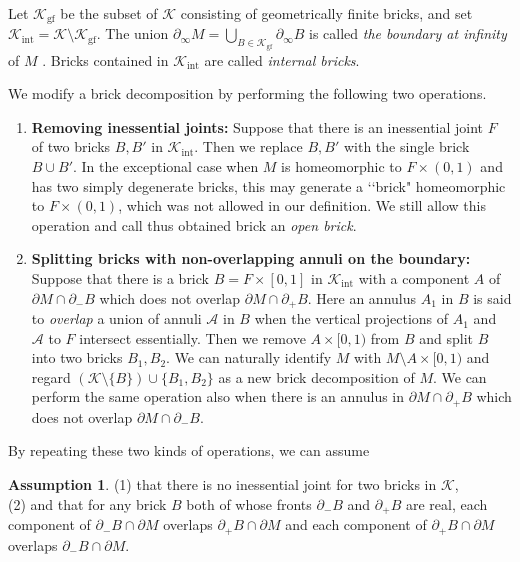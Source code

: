 \documentclass{amsart}
\theoremstyle{definition}
\newtheorem{assumption}[theorem]{Assumption}
\numberwithin{figure}{section}
\numberwithin{equation}{section}
\def\ck{\mathcal{K}}
\def\part{\partial}
\begin{document}
\medskip


Let $\ck_{\mathrm{gf}}$ be the subset of $\ck$ consisting of geometrically finite bricks, 
and set $\ck_{\mathrm{int}}=\ck\setminus \ck_{\mathrm{gf}}$.
The union $\part_\infty M=\bigcup_{B\in \ck_{\mathrm{gf}}}\part_\infty B$ is called \emph{the boundary at infinity} of $M$ .
Bricks contained in  $\ck_{\mathrm{int}}$ are called \emph{internal bricks}. 

We modify a brick decomposition by performing the following two operations.
\begin{enumerate}
\item {\bf Removing inessential joints:}
Suppose that there is an inessential joint $F$ of two bricks $B,B'$ in $\ck_{\mathrm{int}}$.
Then 
 we replace  $B,B'$ with the single brick $B\cup B'$.
 In the exceptional case when $M$ is homeomorphic to $F \times (0,1)$ and has two simply degenerate bricks, this may generate a \lq \lq brick" homeomorphic to $F \times (0,1)$, which was not allowed in our definition.
 We still allow this operation and call thus obtained brick an {\em open brick}.
 \item {\bf Splitting bricks with non-overlapping annuli on the boundary:}
 Suppose that there is a brick $B=F \times [0,1]$ in $\ck_{\mathrm{int}}$ with a component $A$ of $\partial M \cap \partial_-B$ which does not overlap $\partial M \cap \partial_+B$.
  Here an annulus $A_1$ in $B$ is said to {\em overlap} a union of annuli $\mathcal A$ in $B$ when the vertical projections  of $A_1$ and $\mathcal A$ to $F$ intersect essentially.
Then we remove $A \times [0,1)$ from $B$ and split $B$ into two bricks $B_1, B_2$.
We can naturally identify $M$ with $M \setminus A \times [0,1)$ and regard $(\ck \setminus \{B\}) \cup \{B_1, B_2\}$ as a new brick decomposition of $M$.
We can perform the same operation also when there is an annulus in $\partial M \cap \partial_+B$ which does not overlap $\partial M \cap \partial_-B$.
\end{enumerate}
By repeating these two kinds of operations, we can assume 

\begin{assumption}
\label{modification}
(1)
that there is no inessential joint for two bricks in $\ck$, \\
(2)
and that for any brick $B$ both of whose fronts $\partial_- B$ and $\partial_+B$ are real, each component of $\partial_- B \cap \partial M$ overlaps  $\partial_+ B \cap \partial M$ and each component of $\partial_+ B \cap \partial M$ overlaps $\partial_- B \cap \partial M$.
\end{assumption}
\end{document}

